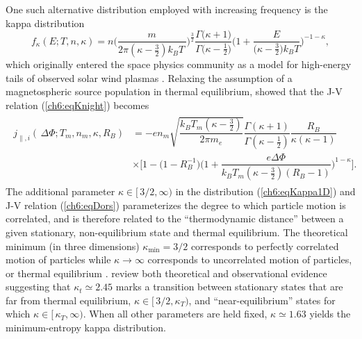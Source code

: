   One such alternative distribution employed with increasing frequency is the
  kappa distribution \citep{Livadiotis2013}
    \begin{equation} \label{ch6:eqKappa1D} f_{\kappa}(E; T, n, \kappa) = n \Bigg
      ( \dfrac{m}{2 \pi (\kappa - \frac{3}{2}) k_{B} T \, } \Bigg
      )^{\frac{3}{2}} \dfrac{\Gamma \big ( \kappa + 1 \big ) }{\Gamma \big (
        \kappa - \frac{1}{2} \big ) } \Bigg ( 1 + \dfrac{E}{ \big ( \kappa -
        \frac{3}{2} \big ) k_B T } \Bigg )^{-1 - \kappa},
    \end{equation}
  which originally entered the space physics community as a model for
  high-energy tails of observed solar wind plasmas
  \citep{Vasyliunas1968}. Relaxing the assumption of a magnetospheric source
  population in thermal equilibrium, \citet{Dors1999} showed that the J-V
  relation (\ref{ch6:eqKnight}) becomes
    \begin{align}
      \label{ch6:eqDors}
      \begin{array}{ll}
        j_{\parallel,i} ( \, \Delta \Phi ; T_m, n_m, \kappa, R_B ) &= - e n_m \sqrt{ \dfrac{ k_B T_m (\kappa -
            \frac{3}{2})}{ 2 \pi m_e}} \dfrac{\Gamma (\kappa + 1)}{\Gamma (\kappa - \frac{1}{2})} \dfrac{R_B}{\kappa (\kappa - 1)} \\
        &\times \Bigg[1 - \Big(1 - R_B^{-1} \Big) \Bigg(1+\dfrac{e \Delta \Phi}{ k_B
          T_m (\kappa - \frac{3}{2})(R_B - 1)} \Bigg)^{1-\kappa} \Bigg].
      \end{array}
    \end{align}
  The additional parameter $\kappa \in [ \, 3/2, \infty )$ in the distribution
  (\ref{ch6:eqKappa1D}) and J-V relation (\ref{ch6:eqDors}) parameterizes the
  degree to which particle motion is correlated, and is therefore related to the
  ``thermodynamic distance'' between a given stationary, non-equilibrium state
  and thermal equilibrium. The theoretical minimum (in three dimensions)
  $\kappa_{\textrm{min}} = 3/2$ corresponds to perfectly correlated motion of
  particles while $\kappa \rightarrow \infty$ corresponds to uncorrelated motion
  of particles, or thermal equilibrium
  \citep{Livadiotis2010,Livadiotis2011,Livadiotis2013}. \citet{Livadiotis2010}
  review both theoretical and observational evidence suggesting that $\kappa_t
  \simeq 2.45$ marks a transition between stationary states that are far from
  thermal equilibrium, $\kappa \in [ \, 3/2, \kappa_T )$, and
  ``near-equilibrium'' states for which $\kappa \in [ \, \kappa_T, \infty
  )$. When all other parameters are held fixed, $\kappa \simeq 1.63$ yields the
  minimum-entropy kappa distribution.


